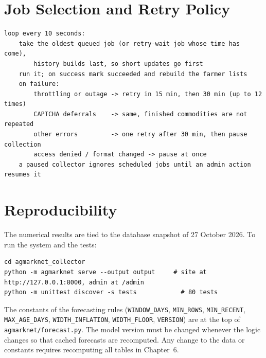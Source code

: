 \documentclass[12pt,a4paper,oneside]{report}
\numberwithin{equation}{chapter}
\numberwithin{figure}{chapter}
\numberwithin{table}{chapter}
\theoremstyle{definition}
\begin{document}
\chapter{Job Selection and Retry Policy}
\begin{lstlisting}[caption={Worker loop (simplified)}]
loop every 10 seconds:
    take the oldest queued job (or retry-wait job whose time has come),
        history builds last, so short updates go first
    run it; on success mark succeeded and rebuild the farmer lists
    on failure:
        throttling or outage -> retry in 15 min, then 30 min (up to 12 times)
        CAPTCHA deferrals    -> same, finished commodities are not repeated
        other errors         -> one retry after 30 min, then pause collection
        access denied / format changed -> pause at once
    a paused collector ignores scheduled jobs until an admin action resumes it
\end{lstlisting}

\chapter{Reproducibility}
The numerical results are tied to the database snapshot of 27 October 2026. To run the system and the tests:
\begin{lstlisting}
cd agmarknet_collector
python -m agmarknet serve --output output     # site at http://127.0.0.1:8000, admin at /admin
python -m unittest discover -s tests            # 80 tests
\end{lstlisting}
The constants of the forecasting rules (\texttt{WINDOW\_DAYS}, \texttt{MIN\_ROWS}, \texttt{MIN\_RECENT}, \texttt{MAX\_AGE\_DAYS}, \texttt{WIDTH\_INFLATION}, \texttt{WIDTH\_FLOOR}, \texttt{VERSION}) are at the top of \texttt{agmarknet/forecast.py}. The model version must be changed whenever the logic changes so that cached forecasts are recomputed. Any change to the data or constants requires recomputing all tables in Chapter~6.
\end{document}

